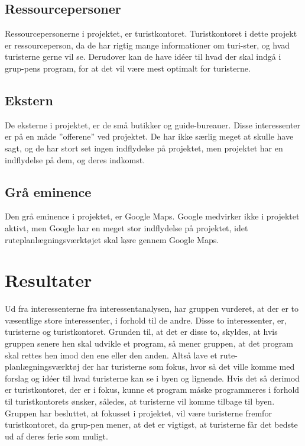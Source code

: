 \subsection{Ressourcepersoner}
Ressourcepersonerne i projektet, er turistkontoret.
Turistkontoret i dette projekt er ressourceperson, da de har rigtig mange informationer om turi-ster, og hvad turisterne gerne vil se. Derudover kan de have idéer til hvad der skal indgå i grup-pens program, for at det vil være mest optimalt for turisterne.   

\subsection{Ekstern}
De eksterne i projektet, er de små butikker og guide-bureauer.
Disse interessenter er på en måde ”offerene” ved projektet. De har ikke særlig meget at skulle have sagt, og de har stort set ingen indflydelse på projektet, men projektet har en indflydelse på dem, og deres indkomst. 

\subsection{Grå eminence}
Den grå eminence i projektet, er Google Maps.
Google medvirker ikke i projektet aktivt, men Google har en meget stor indflydelse på projektet, idet ruteplanlægningsværktøjet skal køre gennem Google Maps. 

 
\section{Resultater}

Ud fra interessenterne fra interessentanalysen, har gruppen vurderet, at der er to væsentlige store interessenter, i forhold til de andre. Disse to interessenter, er, turisterne og turistkontoret. 
Grunden til, at det er disse to, skyldes, at hvis gruppen senere hen skal udvikle et program, så mener gruppen, at det program skal rettes hen imod den ene eller den anden. Altså lave et rute-planlægningsværktøj der har turisterne som fokus, hvor så det ville komme med forslag og idéer til hvad turisterne kan se i byen og lignende. Hvis det så derimod er turistkontoret, der er i fokus, kunne et program måske programmeres i forhold til turistkontorets ønsker, således, at turisterne vil komme tilbage til byen. 
Gruppen har besluttet, at fokusset i projektet, vil være turisterne fremfor turistkontoret, da grup-pen mener, at det er vigtigst, at turisterne får det bedste ud af deres ferie som muligt. 
 
